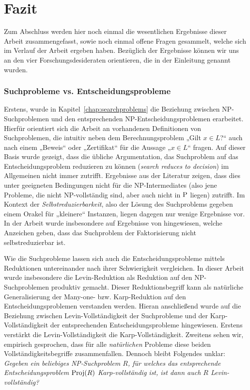 \chapter{Fazit}\label{chap:conclusion}

Zum Abschluss werden hier noch einmal die wesentlichen Ergebnisse dieser Arbeit zusammengefasst, sowie noch einmal offene Fragen gesammelt, welche sich im Verlauf der Arbeit ergeben haben.
Bezüglich der Ergebnisse können wir uns an den vier Forschungsdesideraten orientieren, die in der Einleitung genannt wurden.

\subsection*{Suchprobleme vs. Entscheidungsprobleme}

Erstens, wurde in Kapitel~\ref{chap:searchproblems} die Beziehung zwischen NP-Suchproblemen und den entsprechenden NP-Entscheidungsproblemen erarbeitet.
Hierfür orientiert sich die Arbeit an vorhandenen Definitionen von Suchproblemen, die intuitiv neben dem Berechnungsproblem „Gilt $x\in L$?“ auch nach einem „Beweis“ oder „Zertifikat“ für die Aussage „$x\in L$“ fragen. 
Auf dieser Basis wurde gezeigt, dass die übliche Argumentation, das Suchproblem auf das Entscheidungsproblem reduzieren zu können (\emph{search reduces to decision}) im Allgemeinen nicht immer zutrifft. Ergebnisse aus der Literatur zeigen, dass dies unter geeigneten Bedingungen nicht für die NP-Intermediates (also jene Probleme, die nicht NP-vollständig sind, aber auch nicht in $\P$ liegen) zutrifft.
Im Kontext der \emph{Selbstreduzierbarkeit}, also der Lösung des Suchproblems gegeben einem Orakel für „kleinere“ Instanzen, liegen dagegen nur wenige Ergebnisse vor. In der Arbeit wurde insbesondere auf Ergebnisse von \textcite{harsha_downward_2023} hingewiesen, welche Anzeichen geben, dass das Suchproblem der Faktorisierung nicht selbstreduzierbar ist.

Wie die Suchprobleme lassen sich auch die Entscheidungsprobleme mittels Reduktionen untereinander nach ihrer Schwierigkeit vergleichen. In dieser Arbeit wurde insbesondere die Levin-Reduktion als Reduktion auf den NP-Suchproblemen produktiv gemacht. Dieser Reduktionsbegriff kann als natürliche Generalisierung der Many-one- bzw. Karp-Reduktion auf den Entscheidungsproblemen verstanden werden. Hieran anschließend wurde auf die Beziehung zwischen Levin-Vollständigkeit der Suchprobleme und der Karp-Vollständigkeit der entsprechenden Entscheidungsprobleme hingewiesen. Erstens verstärkt die Levin-Vollständigkeit die Karp-Vollständigkeit. Zweitens sehen wir, empirisch gesprochen, dass für alle \emph{natürlichen} Probleme diese beiden Vollständigkeitsbegriffe zusammenfallen. 
Dennoch bleibt Folgendes unklar: \emph{Gegeben ein beliebiges NP-Suchproblem $R$, für welches das entsprechende Entscheidungsproblem $\Proj(R)$ Karp-vollständig ist, ist dann auch $R$ Levin-vollständig?}

